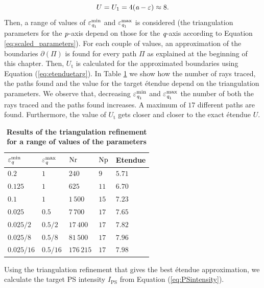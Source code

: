 \begin{equation}
U = U_1 = 4(\textit{a}-\varepsilon)\approx 8.
\end{equation}
Then, a range of values of $\varepsilon_{\textit{q}_1}^{\textrm{min}}$ and $\varepsilon_{\textit{q}_1}^{\textrm{max}}$ is considered (the triangulation parameters for the $\textit{p}$-axis depend on those for the $\textit{q}$-axis according to Equation \ref{eq:scaled_parameters}). For each couple of values, an approximation of the boundaries $\partial$$(\Pi)$ is found for every path $\Pi$ as explained at the beginning of this chapter. Then, $U_{\textrm{t}}$ is calculated for the approximated boundaries using Equation (\ref{eq:etenduetarg}). In Table \ref{tab:etendue_pr} we show how the number of rays traced, the paths found and the value for the target \'{e}tendue depend on the triangulation parameters.
We observe that, decreasing $\varepsilon_{\textit{q}_1}^{\textrm{min}}$ and $\varepsilon_{\textit{q}_1}^{\textrm{max}}$ the number of both the rays traced and the paths found increases. A maximum of $17$ different paths are found. Furthermore, the value of $U_{\textrm{t}}$ gets closer and closer to the exact \'{e}tendue $U$.
\begin{table}[ht] 
\centering
\caption{\bf Results of the triangulation refinement for a range of values of the parameters}
\begin{tabular}{lllll}
 \hline   $\varepsilon_{\textit{q}}^{\textrm{min}} $  & $\varepsilon_{\textit{q}}^{\textrm{max}}$ & $\textrm{Nr}$ & $\textrm{Np}$ & Etendue \\
  \hline 
 $0.2$ & $1$   & $240$   &  $9$ & $5.71$\\
$0.125$  & $1$    & $625$    & $11$ & $6.70$ \\
$0.1$ & $1$   & $1\,500$   &  $15$ & $7.23$\\
$0.025$  & $0.5$    & $7\,700$  & $17$ & $7.65$\\
 $0.025/2$  & $0.5/2$  & $17\,400$   & $17$ & $7.82$\\
 $0.025/8$ & $0.5/8$  & $81\,500$    & $17$ & $7.96$\\
$0.025/16$ & $0.5/16$  & $176\,215$    & $17$ & $7.98$\\
 \hline
 \end{tabular}
 \label{tab:etendue_pr}
 \end{table}
Using the triangulation refinement that gives the best \'{e}tendue approximation, we calculate the target PS intensity $\hat{I}_{\textrm{PS}}$ from Equation (\ref{eq:PSintensity}).
